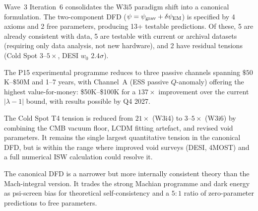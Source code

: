 \documentclass[11pt]{article}
\newcommand{\psigrav}{\psi_{\rm grav}}
\newcommand{\dpsiEM}{\delta\psi_{\rm EM}}
\newcommand{\lamdiff}{|\lambda{-}1|}
\begin{document}
Wave~3 Iteration~6 consolidates the W3i5 paradigm shift into a canonical
formulation. The two-component DFD ($\psi = \psigrav + \dpsiEM$) is
specified by 4 axioms and 2 free parameters, producing 13+ testable
predictions. Of these, 5 are already consistent with data, 5 are testable
with current or archival datasets (requiring only data analysis, not new
hardware), and 2 have residual tensions (Cold Spot $3$--$5\times$, DESI
$w_0$ $2.4\sigma$).

The P15 experimental programme reduces to three passive channels spanning
$\$50$K--$\$50$M and 1--7 years, with Channel~A (ESS passive $Q$-anomaly)
offering the highest value-for-money: \$50K--\$100K for a $137\times$
improvement over the current $\lamdiff$ bound, with results possible by
Q4 2027.

The Cold Spot T4 tension is reduced from $21\times$ (W3i4) to
$3$--$5\times$ (W3i6) by combining the CMB vacuum floor, LCDM fitting
artefact, and revised void parameters. It remains the single largest
quantitative tension in the canonical DFD, but is within the range where
improved void surveys (DESI, 4MOST) and a full numerical ISW calculation
could resolve it.

The canonical DFD is a narrower but more internally consistent theory
than the Mach-integral version. It trades the strong Machian programme
and dark energy as psi-screen bias for theoretical self-consistency
and a $5:1$ ratio of zero-parameter predictions to free parameters.
\end{document}
